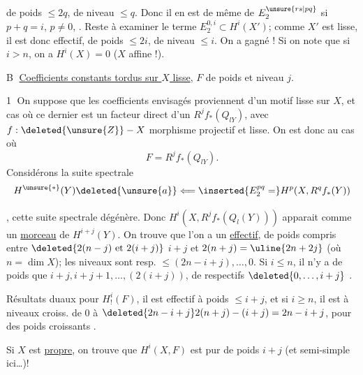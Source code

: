 de  poids $\le2q$, de niveau $\le q$. Donc il en est de même de $E^{\unsure{rs|pq}}_2$ si $p+q=i$, $p\ne0$, . Reste à examiner le terme $E^{0,i}_2\subset H^i(X')$; comme $X'$ est lisse, il est donc effectif, de poids $\le2i$, de niveau $\le i$. On a gagné ! Si on note que si $i>n$, on a $H^i(X)=0$ ($X$ affine !).


\textcircled{B} \uline{Coefficients constants tordus sur $X$ lisse},  $F$  de poids et niveau $j$.

\textcircled{1} On suppose que les coefficients envisagés proviennent d'un motif lisse sur $X$, et   cas où ce dernier est un facteur direct d'un $R^jf_*(Q_{l Y})$, avec $f:\deleted{\unsure{Z}}\mathbin{-}X$ morphisme projectif et lisse.  On est donc  au cas où
\[
F=R^jf_*(Q_{l Y}).
\]
Considérons la suite spectrale
\[
H^{\unsure{*}}(Y)\deleted{\unsure{a}}\Longleftarrow
\inserted{E^{pq}_2=}
H^p(X,R^qf_*(Y))
\]

, cette suite spectrale dégénère. Donc $H^i(X,R^jf_*(Q_l(Y)))$  apparait comme un \uline{morceau} de $H^{i+j}(Y)$. On trouve que l'on a un  \uline{effectif}, de poids \deleted{\unsure{\ne}} compris entre
$\deleted{2(n-j)\text{ et }2(i+j)}$
\uline{$i+j$} et $2(n+j)=\uline{2n+2j}$ (où $n=\dim X$);
les niveaux sont resp. $\le(2n-i+j),\ldots,0$.
Si $i\le n$, il n'y a de poids que  $i+j,i+j+1,\ldots,(2(i+j))$, de   respectifs
$\deleted{0,\ldots,i+j}$ .


Résultats duaux pour $H^i_!(F)$, il est effectif à poids $\le i+j$, et  si $i\ge n$, il est à niveaux croiss. de $0$ à $\deleted{2n-i+j}2(n+j)-(i+j)=2n-i+j$, pour des poids croissants .


Si $X$ est \uline{propre}, on trouve que $H^i(X,F)$ est pur de poids $i+j$ (et semi-simple ici\ldots)!
